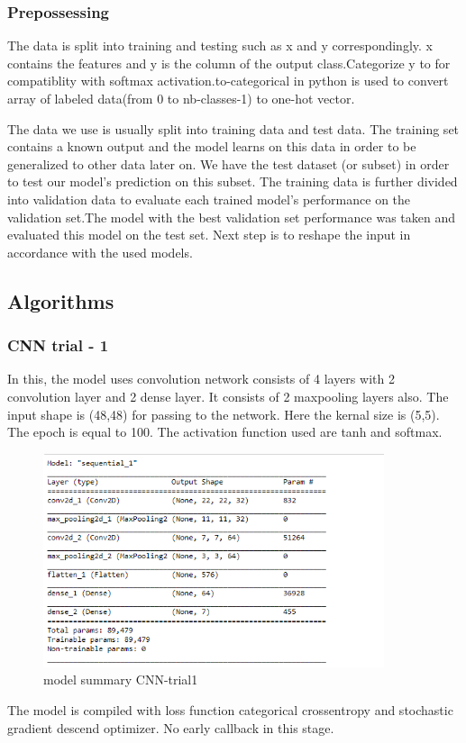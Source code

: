 \subsubsection{Prepossessing}

The data is split into training and testing such as x and y correspondingly. x contains the features and y is the column of the output class.Categorize y to for compatiblity with softmax activation.to-categorical in python is used to convert array of labeled data(from 0 to nb-classes-1) to one-hot vector. 

 The data we use is usually split into training data and test data. The training set contains a known output and the model learns on this data in order to be generalized to other data later on. We have the test dataset (or subset) in order to test our model's prediction on this subset. The training data is further divided into validation data to evaluate each trained model's performance on the validation set.The model with the best validation set performance was taken and evaluated this model on the test set.
 Next step is to reshape the input in accordance with the used models.
 
 \subsection{Algorithms}
 \subsubsection{CNN trial - 1}
 In this, the model uses convolution network consists of 4 layers with 2 convolution layer and 2 dense layer. It consists of 2 maxpooling layers also. The input shape is (48,48) for passing to the network.
 Here the kernal size is (5,5). The epoch is equal to 100. The activation function used are tanh and softmax.
 
\begin{figure}[h]
\label{ss}
\centering
\includegraphics[width= 10cm]{cnn_trial1sum.PNG}
\caption{model summary CNN-trial1}
\end{figure} 
The model is compiled with loss function categorical crossentropy and stochastic gradient descend optimizer. No early callback in this stage.

